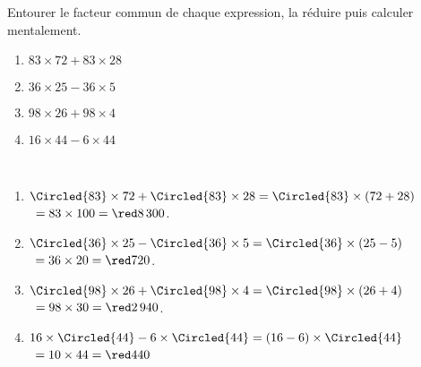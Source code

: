 \begin{exercice*} %
   Entourer le facteur commun de chaque expression, la réduire puis calculer mentalement.
   \begin{enumerate}
      \item $83\times72+83 \times28$
      \item $36 \times25-36\times5$
      \item $98\times26+98\times4$
      \item $16\times44-6\times44$
   \end{enumerate}
\end{exercice*}

\begin{corrige}
   \ \\ [-5mm]
   \begin{enumerate}
      \item $\Circled{83}\times72+\Circled{83} \times28 =\Circled{83}\times(72+28)$ \\
         \quad\, $=83\times100 =\red 8\,300$.
      \item $\Circled{36}\times25-\Circled{36}\times5 =\Circled{36}\times(25-5)$ \\
         \quad\, $=36\times20 =\red 720$.
      \item $\Circled{98}\times26+\Circled{98}\times4 =\Circled{98}\times(26+4)$ \\
         \quad\, $=98\times30 =\red 2\,940$.
      \item $16\times\Circled{44}-6\times\Circled{44} =(16-6)\times\Circled{44}$ \\
         \quad\, $=10\times44 =\red 440$
   \end{enumerate}
\end{corrige}

